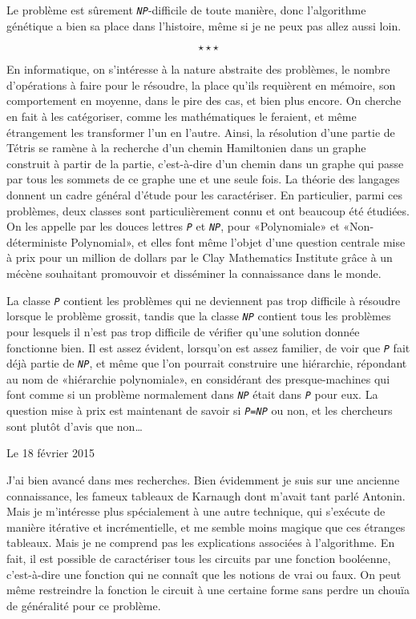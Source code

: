 \documentclass[12pt,final]{report} %
\newcommand{\stardelimiter}{
\[ \star \star \star \]
\newpage
}
\newcommand{\datemarge}[1]{%
   \newpage
        {\color{blue}#1}

}
\newcommand{\majuscule}[1]{\emph{\texttt{#1}}}
\begin{document}
{Le problème est sûrement \majuscule{NP}-difficile de toute manière, donc l'algorithme génétique a bien sa place dans l'histoire, même si je ne peux pas allez aussi loin.

\stardelimiter{}

En informatique, on s'intéresse à la nature abstraite des problèmes, le nombre d'opérations à faire pour le résoudre, la place qu'ils requièrent en mémoire, son comportement en moyenne, dans le pire des cas, et bien plus encore.
On cherche en fait à les catégoriser, comme les mathématiques le feraient, et même étrangement les transformer l'un en l'autre. 
Ainsi, la résolution d'une partie de Tétris se ramène à la recherche d'un chemin Hamiltonien dans un graphe construit à partir de la partie, c'est-à-dire d'un chemin dans un graphe qui passe par tous les sommets de ce graphe une et une seule fois.
La théorie des langages donnent un cadre général d'étude pour les caractériser.
En particulier, parmi ces problèmes, deux classes sont particulièrement connu et ont beaucoup été étudiées.
On les appelle par les douces lettres \majuscule{P} et \majuscule{NP}, pour «Polynomiale» et «Non-déterministe Polynomial», et elles font même l'objet d'une question centrale mise à prix pour un million de dollars par le Clay Mathematics Institute grâce à un mécène souhaitant promouvoir et disséminer la connaissance dans le monde. 

La classe \majuscule{P} contient les problèmes qui ne deviennent pas trop difficile à résoudre lorsque le problème grossit, tandis que la classe \majuscule{NP} contient tous les problèmes pour lesquels il n'est pas trop difficile de vérifier qu'une solution donnée fonctionne bien.
Il est assez évident, lorsqu'on est assez familier, de voir que \majuscule{P} fait déjà partie de \majuscule{NP}, et même que l'on pourrait construire une hiérarchie, répondant au nom de «hiérarchie polynomiale», en considérant des presque-machines qui font comme si un problème normalement dans \majuscule{NP} était dans \majuscule{P} pour eux. 
La question mise à prix est maintenant de savoir si \majuscule{P=NP} ou non, et les chercheurs sont plutôt d'avis que non\dots


\datemarge{Le 18 février 2015} %

J'ai bien avancé dans mes recherches.
Bien évidemment je suis sur une ancienne connaissance, les fameux tableaux de Karnaugh dont m'avait tant parlé Antonin. 
Mais je m'intéresse plus spécialement à une autre technique, qui s'exécute de manière itérative et incrémentielle, et me semble moins magique que ces étranges tableaux.
Mais je ne comprend pas les explications associées à l'algorithme.
En fait, il est possible de caractériser tous les circuits par une fonction booléenne, c'est-à-dire une fonction qui ne connaît que les notions de vrai ou faux.
On peut même restreindre la fonction le circuit à une certaine forme sans perdre un chouïa de généralité pour ce problème.

}
\end{document}
